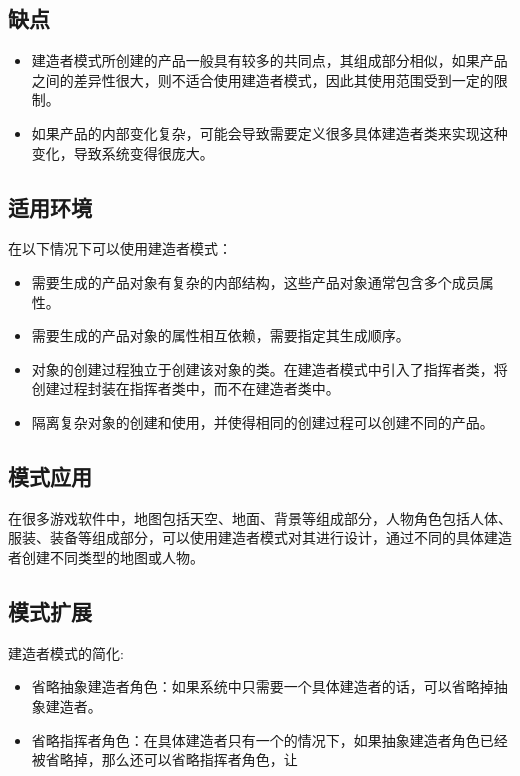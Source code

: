 \documentclass[letterpaper,10pt,english]{sphinxmanual}
\begin{document}
\subsection{缺点}
\label{\detokenize{creational_patterns/builder:id11}}\begin{itemize}
\item {} 
\sphinxAtStartPar
建造者模式所创建的产品一般具有较多的共同点，其组成部分相似，如果产品之间的差异性很大，则不适合使用建造者模式，因此其使用范围受到一定的限制。

\item {} 
\sphinxAtStartPar
如果产品的内部变化复杂，可能会导致需要定义很多具体建造者类来实现这种变化，导致系统变得很庞大。

\end{itemize}


\subsection{适用环境}
\label{\detokenize{creational_patterns/builder:id12}}
\sphinxAtStartPar
在以下情况下可以使用建造者模式：
\begin{itemize}
\item {} 
\sphinxAtStartPar
需要生成的产品对象有复杂的内部结构，这些产品对象通常包含多个成员属性。

\item {} 
\sphinxAtStartPar
需要生成的产品对象的属性相互依赖，需要指定其生成顺序。

\item {} 
\sphinxAtStartPar
对象的创建过程独立于创建该对象的类。在建造者模式中引入了指挥者类，将创建过程封装在指挥者类中，而不在建造者类中。

\item {} 
\sphinxAtStartPar
隔离复杂对象的创建和使用，并使得相同的创建过程可以创建不同的产品。

\end{itemize}


\subsection{模式应用}
\label{\detokenize{creational_patterns/builder:id13}}
\sphinxAtStartPar
在很多游戏软件中，地图包括天空、地面、背景等组成部分，人物角色包括人体、服装、装备等组成部分，可以使用建造者模式对其进行设计，通过不同的具体建造者创建不同类型的地图或人物。


\subsection{模式扩展}
\label{\detokenize{creational_patterns/builder:id14}}
\sphinxAtStartPar
建造者模式的简化:
\begin{itemize}
\item {} 
\sphinxAtStartPar
省略抽象建造者角色：如果系统中只需要一个具体建造者的话，可以省略掉抽象建造者。

\item {} 
\sphinxAtStartPar
省略指挥者角色：在具体建造者只有一个的情况下，如果抽象建造者角色已经被省略掉，那么还可以省略指挥者角色，让

\end{itemize}
\end{document}
